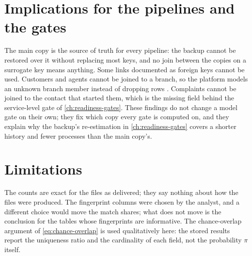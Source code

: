 \section{Implications for the pipelines and the gates}\label{sec:inv-implications}

The main copy is the source of truth for every pipeline: the backup cannot be restored over it without replacing most
keys, and no join between the copies on a surrogate key means anything. Some links documented as foreign keys cannot
be used. Customers and agents cannot be joined to a branch, so the platform models an unknown branch member instead of
dropping rows \autocite{kimball2013}. Complaints cannot be joined to the contact that started them, which is the
missing field behind the service-level gate of \cref{ch:readiness-gates}. These findings do not change a model gate
on their own; they fix which copy every gate is computed on, and they explain why the backup's re-estimation in
\cref{ch:readiness-gates} covers a shorter history and fewer processes than the main copy's.

\section{Limitations}\label{sec:inv-limits}

The counts are exact for the files as delivered; they say nothing about how the files were produced. The fingerprint
columns were chosen by the analyst, and a different choice would move the match shares; what does not move is the
conclusion for the tables whose fingerprints are informative. The chance-overlap argument of
\cref{eq:chance-overlap} is used qualitatively here: the stored results report the uniqueness ratio and the
cardinality of each field, not the probability $\pi$ itself.

